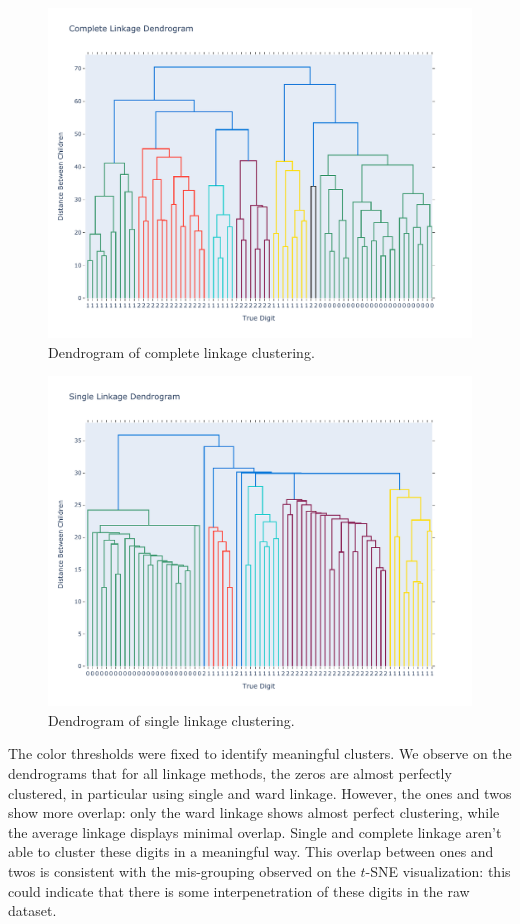 \documentclass[12pt]{article}
\begin{document}
  \begin{figure}[!ht]
    \centering
    \includegraphics[width=\textwidth]{figures/hclust3}
    \caption{Dendrogram of complete linkage clustering.}%
    \label{fig:hclust3}
  \end{figure} 

  \begin{figure}[!ht]
    \centering
    \includegraphics[width=\textwidth]{figures/hclust4}
    \caption{Dendrogram of single linkage clustering.}%
    \label{fig:hclust4}
  \end{figure} 

  The color thresholds were fixed to identify meaningful clusters. We observe
  on the dendrograms that for all linkage methods, the zeros are almost
  perfectly clustered, in particular using single and ward linkage. However,
  the ones and twos show more overlap: only the ward linkage shows almost
  perfect clustering, while the average linkage displays minimal overlap.
  Single and complete linkage aren't able to cluster these digits in a
  meaningful way. This overlap between ones and twos is consistent with the
  mis-grouping observed on the $t$-SNE visualization: this could indicate that
  there is some interpenetration of these digits in the raw dataset.
\end{document}
